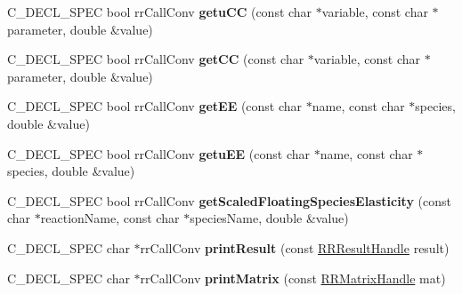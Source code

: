 \begin{DoxyCompactItemize}
\item 
\hypertarget{group__loadsave_ga6655b7aebdc9e6fad4e7a54e3de9195d}{
\-C\-\_\-\-D\-E\-C\-L\-\_\-\-S\-P\-E\-C bool rr\-Call\-Conv {\bfseries getu\-C\-C} (const char $\ast$variable, const char $\ast$parameter, double \&value)}
\label{group__loadsave_ga6655b7aebdc9e6fad4e7a54e3de9195d}

\item 
\hypertarget{group__loadsave_ga49c703842a069c37fa472f2740dd514b}{
\-C\-\_\-\-D\-E\-C\-L\-\_\-\-S\-P\-E\-C bool rr\-Call\-Conv {\bfseries get\-C\-C} (const char $\ast$variable, const char $\ast$parameter, double \&value)}
\label{group__loadsave_ga49c703842a069c37fa472f2740dd514b}

\item 
\hypertarget{group__loadsave_ga761a98e3635d75c8505f516a0b2384b1}{
\-C\-\_\-\-D\-E\-C\-L\-\_\-\-S\-P\-E\-C bool rr\-Call\-Conv {\bfseries get\-E\-E} (const char $\ast$name, const char $\ast$species, double \&value)}
\label{group__loadsave_ga761a98e3635d75c8505f516a0b2384b1}

\item 
\hypertarget{group__loadsave_gadf71d426da852cdf931022fa56a3acb0}{
\-C\-\_\-\-D\-E\-C\-L\-\_\-\-S\-P\-E\-C bool rr\-Call\-Conv {\bfseries getu\-E\-E} (const char $\ast$name, const char $\ast$species, double \&value)}
\label{group__loadsave_gadf71d426da852cdf931022fa56a3acb0}

\item 
\hypertarget{group__loadsave_ga8f7a0a9f82d038a325c5e38f7596a0d1}{
\-C\-\_\-\-D\-E\-C\-L\-\_\-\-S\-P\-E\-C bool rr\-Call\-Conv {\bfseries get\-Scaled\-Floating\-Species\-Elasticity} (const char $\ast$reaction\-Name, const char $\ast$species\-Name, double \&value)}
\label{group__loadsave_ga8f7a0a9f82d038a325c5e38f7596a0d1}

\item 
\hypertarget{group__loadsave_ga40c29c6c6773091005de86df2b8a7b6b}{
\-C\-\_\-\-D\-E\-C\-L\-\_\-\-S\-P\-E\-C char $\ast$rr\-Call\-Conv {\bfseries print\-Result} (const \hyperlink{struct_r_r_result}{\-R\-R\-Result\-Handle} result)}
\label{group__loadsave_ga40c29c6c6773091005de86df2b8a7b6b}

\item 
\hypertarget{group__loadsave_ga61de73039780b4036d73922a1560f5e8}{
\-C\-\_\-\-D\-E\-C\-L\-\_\-\-S\-P\-E\-C char $\ast$rr\-Call\-Conv {\bfseries print\-Matrix} (const \hyperlink{struct_r_r_matrix}{\-R\-R\-Matrix\-Handle} mat)}
\label{group__loadsave_ga61de73039780b4036d73922a1560f5e8}


\end{DoxyCompactItemize}
